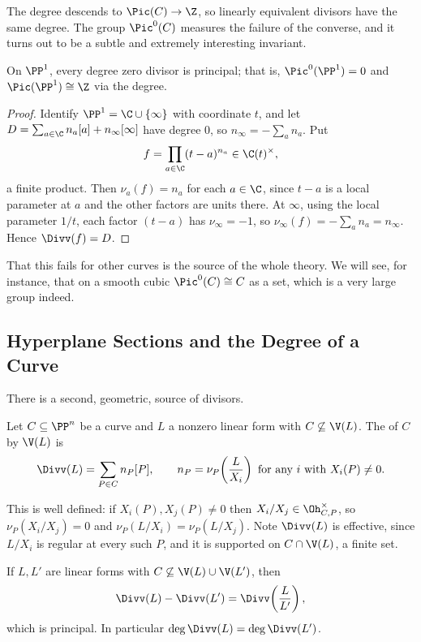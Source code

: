 The degree descends to $\Pic(C) \to \Z$, so linearly equivalent divisors have the same degree. The group $\Pic^0(C)$ measures the failure of the converse, and it turns out to be a subtle and extremely interesting invariant.

\begin{proposition}\label{prop:picP1}
	On $\PP^1$, every degree zero divisor is principal; that is, $\Pic^0(\PP^1) = 0$ and $\Pic(\PP^1)\cong\Z$ via the degree.
\end{proposition}

\begin{proof}
	Identify $\PP^1 = \C\cup\{\infty\}$ with coordinate $t$, and let $D = \sum_{a\in\C}n_a[a] + n_\infty[\infty]$ have degree $0$, so $n_\infty = -\sum_a n_a$. Put
	$$f = \prod_{a \in \C}(t-a)^{n_a} \in \C(t)^\times,$$
	a finite product. Then $\nu_a(f) = n_a$ for each $a \in \C$, since $t-a$ is a local parameter at $a$ and the other factors are units there. At $\infty$, using the local parameter $1/t$, each factor $(t-a)$ has $\nu_\infty = -1$, so $\nu_\infty(f) = -\sum_a n_a = n_\infty$. Hence $\Divv(f) = D$.
\end{proof}

That this fails for other curves is the source of the whole theory. We will see, for instance, that on a smooth cubic $\Pic^0(C) \cong C$ as a set, which is a very large group indeed.

\subsection{Hyperplane Sections and the Degree of a Curve}

There is a second, geometric, source of divisors.

\begin{definition}
	Let $C \subseteq \PP^n$ be a curve and $L$ a nonzero linear form with $C \not\subseteq \V(L)$. The  of $C$ by $\V(L)$ is
	$$\Divv(L) = \sum_{P\in C} n_P[P], \qquad n_P = \nu_P\!\left(\frac{L}{X_i}\right) \text{ for any } i \text{ with } X_i(P)\neq 0.$$
\end{definition}

This is well defined: if $X_i(P), X_j(P) \neq 0$ then $X_i/X_j \in \Oh_{C,P}^\times$, so $\nu_P(X_i/X_j) = 0$ and $\nu_P(L/X_i) = \nu_P(L/X_j)$. Note $\Divv(L)$ is effective, since $L/X_i$ is regular at every such $P$, and it is supported on $C \cap \V(L)$, a finite set.

\begin{proposition}\label{prop:hyperplanediv}
	If $L,L'$ are linear forms with $C \not\subseteq \V(L)\cup\V(L')$, then
	$$\Divv(L) - \Divv(L') = \Divv\!\left(\frac{L}{L'}\right),$$
	which is principal. In particular $\deg\Divv(L) = \deg\Divv(L')$.
\end{proposition}

